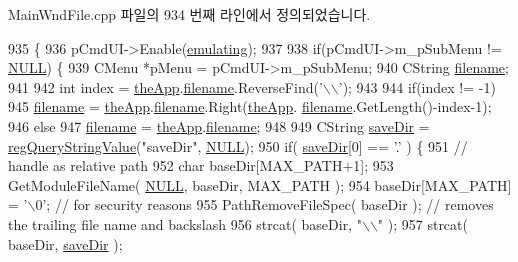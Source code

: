 Main\+Wnd\+File.\+cpp 파일의 934 번째 라인에서 정의되었습니다.


\begin{DoxyCode}
935 \{
936   pCmdUI->Enable(\mbox{\hyperlink{_main_wnd_file_8cpp_af9cc36078b1b311753963297ae7f2a74}{emulating}});
937 
938   \textcolor{keywordflow}{if}(pCmdUI->m\_pSubMenu != \mbox{\hyperlink{getopt1_8c_a070d2ce7b6bb7e5c05602aa8c308d0c4}{NULL}}) \{
939     CMenu *pMenu = pCmdUI->m\_pSubMenu;
940     CString \mbox{\hyperlink{_s_d_l_8cpp_ac33a174c39700095ca0f892624d85a3f}{filename}};
941 
942     \textcolor{keywordtype}{int} index = \mbox{\hyperlink{_v_b_a_8cpp_a8095a9d06b37a7efe3723f3218ad8fb3}{theApp}}.\mbox{\hyperlink{class_v_b_a_a66eee6b61ec8bee20f21164cb0c37d2d}{filename}}.ReverseFind(\textcolor{charliteral}{'\(\backslash\)\(\backslash\)'});
943 
944     \textcolor{keywordflow}{if}(index != -1)
945       \mbox{\hyperlink{_s_d_l_8cpp_ac33a174c39700095ca0f892624d85a3f}{filename}} = \mbox{\hyperlink{_v_b_a_8cpp_a8095a9d06b37a7efe3723f3218ad8fb3}{theApp}}.\mbox{\hyperlink{class_v_b_a_a66eee6b61ec8bee20f21164cb0c37d2d}{filename}}.Right(\mbox{\hyperlink{_v_b_a_8cpp_a8095a9d06b37a7efe3723f3218ad8fb3}{theApp}}.
      \mbox{\hyperlink{class_v_b_a_a66eee6b61ec8bee20f21164cb0c37d2d}{filename}}.GetLength()-index-1);
946     \textcolor{keywordflow}{else}
947       \mbox{\hyperlink{_s_d_l_8cpp_ac33a174c39700095ca0f892624d85a3f}{filename}} = \mbox{\hyperlink{_v_b_a_8cpp_a8095a9d06b37a7efe3723f3218ad8fb3}{theApp}}.\mbox{\hyperlink{class_v_b_a_a66eee6b61ec8bee20f21164cb0c37d2d}{filename}};
948 
949     CString \mbox{\hyperlink{_s_d_l_8cpp_a7b37d94db9ce90c610565cb80ff50444}{saveDir}} = \mbox{\hyperlink{_reg_8cpp_a618826d274df0d9c19fab2ff28bd9008}{regQueryStringValue}}(\textcolor{stringliteral}{"saveDir"}, 
      \mbox{\hyperlink{getopt1_8c_a070d2ce7b6bb7e5c05602aa8c308d0c4}{NULL}});
950     \textcolor{keywordflow}{if}( \mbox{\hyperlink{_s_d_l_8cpp_a7b37d94db9ce90c610565cb80ff50444}{saveDir}}[0] == \textcolor{charliteral}{'.'} ) \{
951         \textcolor{comment}{// handle as relative path}
952         \textcolor{keywordtype}{char} baseDir[MAX\_PATH+1];
953         GetModuleFileName( \mbox{\hyperlink{getopt1_8c_a070d2ce7b6bb7e5c05602aa8c308d0c4}{NULL}}, baseDir, MAX\_PATH );
954         baseDir[MAX\_PATH] = \textcolor{charliteral}{'\(\backslash\)0'}; \textcolor{comment}{// for security reasons}
955         PathRemoveFileSpec( baseDir ); \textcolor{comment}{// removes the trailing file name and backslash}
956         strcat( baseDir, \textcolor{stringliteral}{"\(\backslash\)\(\backslash\)"} );
957         strcat( baseDir, \mbox{\hyperlink{_s_d_l_8cpp_a7b37d94db9ce90c610565cb80ff50444}{saveDir}} );

\end{DoxyCode}
